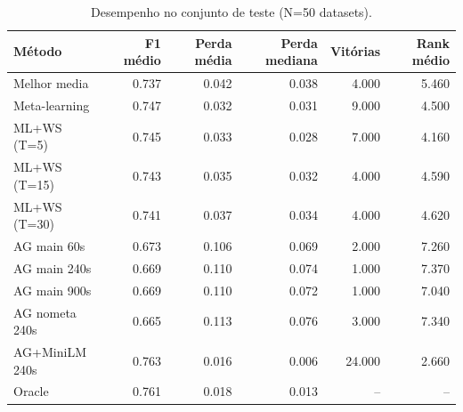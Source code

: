 \begin{table}[htbp]
\centering
\caption{Desempenho no conjunto de teste (N=50 datasets).}
\label{tab:automl-desempenho}
\begin{tabular}{lrrrrr}
\toprule
Método & F1 médio & Perda média & Perda mediana & Vitórias & Rank médio \\
\midrule
Melhor media & 0.737 & 0.042 & 0.038 & 4.000 & 5.460 \\
Meta-learning & 0.747 & 0.032 & 0.031 & 9.000 & 4.500 \\
ML+WS (T=5) & 0.745 & 0.033 & 0.028 & 7.000 & 4.160 \\
ML+WS (T=15) & 0.743 & 0.035 & 0.032 & 4.000 & 4.590 \\
ML+WS (T=30) & 0.741 & 0.037 & 0.034 & 4.000 & 4.620 \\
AG main 60s & 0.673 & 0.106 & 0.069 & 2.000 & 7.260 \\
AG main 240s & 0.669 & 0.110 & 0.074 & 1.000 & 7.370 \\
AG main 900s & 0.669 & 0.110 & 0.072 & 1.000 & 7.040 \\
AG nometa 240s & 0.665 & 0.113 & 0.076 & 3.000 & 7.340 \\
AG+MiniLM 240s & 0.763 & 0.016 & 0.006 & 24.000 & 2.660 \\
Oracle & 0.761 & 0.018 & 0.013 & -- & -- \\
\bottomrule
\end{tabular}
\end{table}
